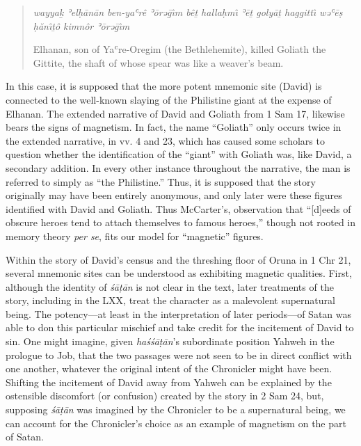  \begin{quote} \emph{wayyaḵ ʾelḥānān ben-yaʿrê ʾōrəḡı̂m bêṯ hallaḥmı̂ ʾēṯ golyāṯ haggittı̂ wəʿēṣ ḥănı̂ṯô kimnôr ʾōrəḡı̂m} 

 Elhanan, son of Yaʿre-Oregim (the Bethlehemite), killed Goliath the Gittite, the shaft of whose spear was like a weaver's beam. \end{quote} 

 In this case, it is supposed that the more potent mnemonic site (David) is connected to the well-known slaying of the Philistine giant at the expense of Elhanan. The extended narrative of David and Goliath from 1 Sam 17, likewise bears the signs of magnetism. In fact, the name ``Goliath'' only occurs twice in the extended narrative, in vv. 4 and 23, which has caused some scholars to question whether the identification of the ``giant'' with Goliath was, like David, a secondary addition. In every other instance throughout the narrative, the man is referred to simply as ``the Philistine.'' Thus, it is supposed that the story originally may have been entirely anonymous, and only later were these figures identified with David and Goliath.\autocites[For a fuller account of the textual issues surrounding the main narrative about David and Goliath, see,][280--309]{mccarter1980}[and][69--77]{mckenzie2000} Thus McCarter's, observation that ``{[}d{]}eeds of obscure heroes tend to attach themselves to famous heroes,''\autocite[450]{mccarter1984} though not rooted in memory theory \emph{per se}, fits our model for ``magnetic'' figures. 

 Within the story of David's census and the threshing floor of Oruna in 1 Chr 21, several mnemonic sites can be understood as exhibiting magnetic qualities. First, although the identity of \emph{śāṭān} is not clear in the text, later treatments of the story, including in the LXX, treat the character as a malevolent supernatural being. The potency---at least in the interpretation of later periods---of Satan was able to don this particular mischief and take credit for the incitement of David to sin. One might imagine, given \emph{haśśāṭān}'s subordinate position \visavis Yahweh in the prologue to Job, that the two passages were not seen to be in direct conflict with one another, whatever the original intent of the Chronicler might have been. Shifting the incitement of David away from Yahweh can be explained by the ostensible discomfort (or confusion) created by the story in 2 Sam 24, but, supposing \emph{śāṭān} was imagined by the Chronicler to be a supernatural being, we can account for the Chronicler's choice as an example of magnetism on the part of Satan. 

